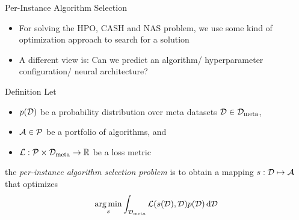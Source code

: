 \begin{frame}[c]{Per-Instance Algorithm Selection}

\begin{itemize}
	\item For solving the HPO, CASH and NAS problem, we use some kind of optimization approach to \alert{search} for a solution
	\item A different view is: Can we \alert{predict} an algorithm/ hyperparameter configuration/ neural architecture?
\end{itemize}

\begin{block}{Definition}
	Let 
	\begin{itemize}
		\item $p(\mathcal{D})$ be a probability \alert{distribution} over meta datasets $\mathcal{D} \in \mathcal{D}_{\text{meta}}$,
		\item $\mathcal{A} \in \mathcal{P}$ be a portfolio of algorithms, and
		\item $\mathcal{L}: \mathcal{P} \times \mathcal{D}_{\text{meta}} \rightarrow \mathbb{R}$ be a loss metric   
	\end{itemize}
	
	the \emph{per-instance algorithm selection problem} is to obtain a mapping 
	$s: \mathcal{D} \mapsto \mathcal{A}$ 
	that optimizes 
	$$\operatorname*{arg\,min}_{s} \int_{\mathcal{D}_{\text{meta}}} \mathcal{L}(s(\mathcal{D}),\mathcal{D}) p(\mathcal{D}) \mathop{}\!\mathrm{d}\mathcal{D}$$
\end{block}

\end{frame}
